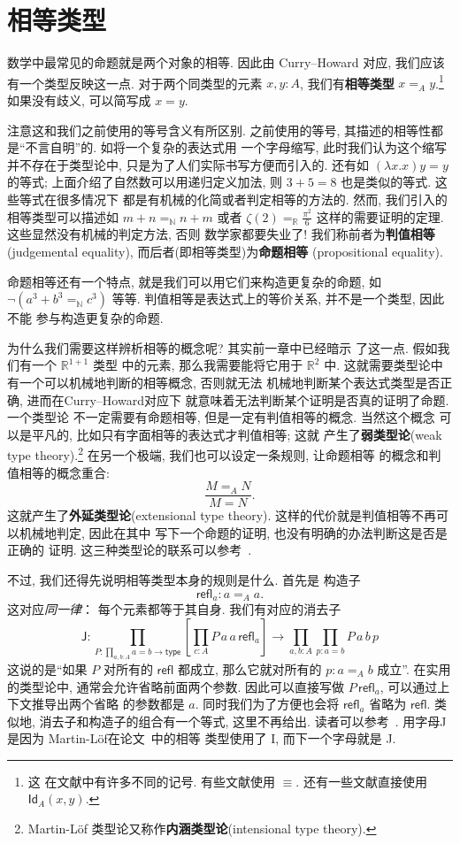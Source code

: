 \documentclass[UTF8]{ctexbook}
\newcommand{\cons}[1]{\textsf{#1}}
\theoremstyle{plain}
\theoremstyle{definition}
\theoremstyle{remark}
\begin{document}
\section{相等类型}
数学中最常见的命题就是两个对象的相等. 因此由 Curry--Howard
对应, 我们应该有一个类型反映这一点. 对于两个同类型的元素
\(x,y : A\), 我们有\textbf{相等类型} \(x =_A y\).\footnote{这
在文献中有许多不同的记号. 有些文献使用 \(\equiv\).
还有一些文献直接使用 \(\cons{Id}_A(x,y)\).}
如果没有歧义, 可以简写成 \(x = y\).

注意这和我们之前使用的等号含义有所区别. 之前使用的等号,
其描述的相等性都是“不言自明”的. 如将一个复杂的表达式用
一个字母缩写, 此时我们认为这个缩写并不存在于类型论中,
只是为了人们实际书写方便而引入的. 还有如 \((\lambda x.x)y = y\)
的等式; 上面介绍了自然数可以用递归定义加法, 则
\(3 + 5 = 8\) 也是类似的等式. 这些等式在很多情况下
都是有机械的化简或者判定相等的方法的. 然而, 我们引入的
相等类型可以描述如 \(m + n =_{\mathbb N} n + m\) 或者 \(\zeta(2) =_{\mathbb R} \frac{\pi^2}{6}\)
这样的需要证明的定理. 这些显然没有机械的判定方法, 否则
数学家都要失业了!
我们称前者为\textbf{判值相等} (judgemental equality),
而后者(即相等类型)为\textbf{命题相等} (propositional equality).

命题相等还有一个特点, 就是我们可以用它们来构造更复杂的命题,
如 \(\neg (a^3 + b^3 =_{\mathbb N} c^3)\) 等等.
判值相等是表达式上的等价关系, 并不是一个类型, 因此不能
参与构造更复杂的命题.

为什么我们需要这样辨析相等的概念呢? 其实前一章中已经暗示
了这一点. 假如我们有一个 \(\mathbb R^{1+1}\) 类型
中的元素, 那么我需要能将它用于 \(\mathbb R^2\) 中.
这就需要类型论中有一个可以机械地判断的相等概念, 否则就无法
机械地判断某个表达式类型是否正确, 进而在Curry--Howard对应下
就意味着无法判断某个证明是否真的证明了命题. 一个类型论
不一定需要有命题相等, 但是一定有判值相等的概念. 当然这个概念
可以是平凡的, 比如只有字面相等的表达式才判值相等; 这就
产生了\textbf{弱类型论}(weak type theory).\footnote{Martin-L\"of
类型论又称作\textbf{内涵类型论}(intensional
type theory).} 在另一个极端, 我们也可以设定一条规则, 让命题相等
的概念和判值相等的概念重合:
\[\frac{M =_A N}{M = N}.\]
这就产生了\textbf{外延类型论}(extensional type theory).
这样的代价就是判值相等不再可以机械地判定, 因此在其中
写下一个命题的证明, 也没有明确的办法判断这是否是正确的
证明. 这三种类型论的联系可以参考~\cite{winterhalter:2018:ettwtt}.

不过, 我们还得先说明相等类型本身的规则是什么. 首先是
构造子
\[\cons{refl}_a : a =_A a.\]
这对应\emph{同一律}： 每个元素都等于其自身.
我们有对应的消去子
\[\cons{J} :
\prod_{P : \prod_{a,b:A} a = b \to \cons{type}}
\left[\prod_{c : A} P\,a\,a\,\cons{refl}_a\right] \to \prod_{a,b:A}\prod_{p : a=b} P\,a\,b\,p\]
这说的是“如果 \(P\) 对所有的 \(\cons{refl}\) 都成立,
那么它就对所有的 \(p : a=_A b\) 成立”.
在实用的类型论中, 通常会允许省略前面两个参数. 因此可以直接写做
\(P\,\cons{refl}_a\), 可以通过上下文推导出两个省略
的参数都是 \(a\). 同时我们为了方便也会将
\(\cons{refl}_a\) 省略为 \(\cons{refl}\).
类似地, 消去子和构造子的组合有一个等式, 这里不再给出.
读者可以参考~\cite{ufp:2013:hottbook}. 用字母J是因为
Martin-L\"of在论文~\cite{martinlof:1984:J}中的相等
类型使用了 I, 而下一个字母就是 J.
\end{document}

